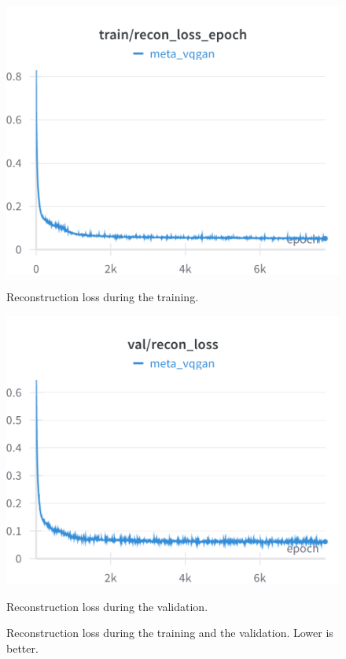 \begin{figure}[H]
\includegraphics[width=\linewidth]{detailed_engineering/Meta VQGAN/charts/Section-2-Panel-13-1qhe42yar.png}
\caption{Reconstruction loss during the training.}
\endminipage\hfill
{}
\includegraphics[width=\linewidth]{detailed_engineering/Meta VQGAN/charts/Section-4-Panel-3-hkj1c12xb.png}
\caption{Reconstruction loss during the validation.}
\endminipage
\caption{Reconstruction loss during the training and the validation. Lower is better.}
\end{figure}

